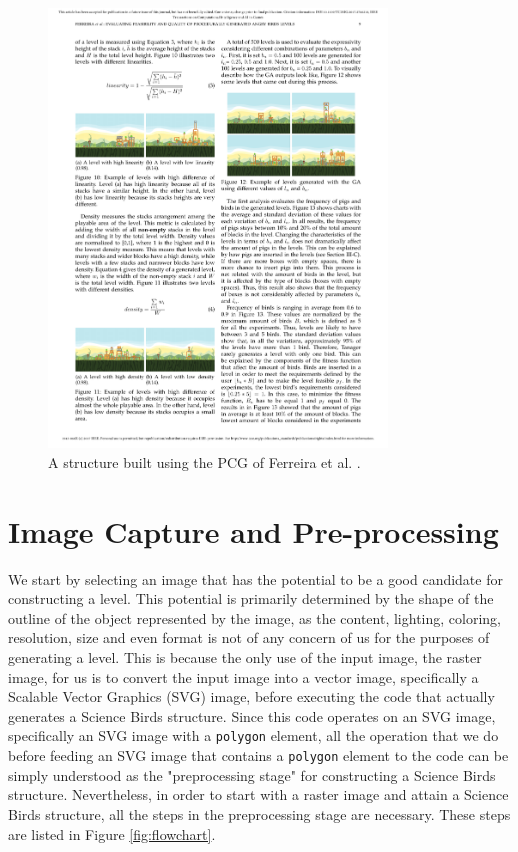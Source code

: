 \documentclass{dalthesis}
\begin{document}
\begin{figure}
\begin{center}
\includegraphics[width=9cm]{./Ferreira2.pdf}
\caption{A structure built using the PCG of Ferreira et al.
\cite{ferreira18}.}
\label{fig:ferreiraEg}
\end{center}
\end{figure}

\chapter{Image Capture and Pre-processing}\label{sec:imagecap}

We start by selecting an image that has the potential to be a good candidate for constructing a level. This potential is primarily determined by the shape of the outline of the object represented by the image, as the content, lighting, coloring, resolution, size and even format is not of any concern of us for the purposes of generating a level. This is because the only use of the input image, the raster image, for us is to convert the input image into a vector image, specifically a Scalable Vector Graphics (SVG) image, before executing the code that actually generates a Science Birds structure. Since this code operates on an SVG image, specifically an SVG image with a \lstinline{polygon} element, all the operation that we do before feeding an SVG image that contains a \lstinline{polygon} element to the code can be simply understood as the "preprocessing stage" for constructing a Science Birds structure. Nevertheless, in order to start with a raster image and attain a Science Birds structure, all the steps in the preprocessing stage are necessary. These steps are listed in Figure \ref{fig:flowchart}.
\end{document}
